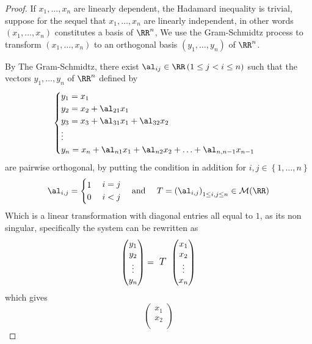 \begin{proof}
If $x_1, \hdots , x_n  $ are linearly dependent, the Hadamard
inequality is trivial, suppose for the sequel that
$x_1, \hdots , x_n  $ are linearly independent, 
in other words
$\left( x_1, \hdots , x_n  \right) $ constitutes a basis 
of $\RR ^n  $, We use the Gram-Schmidtz process to transform
$\left( x_1, \hdots , x_n  \right) $ to an orthogonal basis
$\left( y_1, \hdots , y_n  \right) $ of $\RR ^n  $.

By The Gram-Schmidtz, there exist $\al_{ij}\in  \RR  
\left( 1 \leq j <  i \leq n \right)$ 
such that the vectors $y_1, \hdots , y_n  $ of $\RR ^n  $ defined by
\[
\begin{cases}
y_1 = x_1 \\
y_2 = x_2 + \al_{21} x_1 \\
y_3 = x_3 + \al_{31} x_1 + \al_{32} x_2 \\
\vdots \\
y_n = x_n + \al_{n1}x_1 + \al_{n2} x_2 + \hdots  + 
\al_{n, n-1} x_{n-1}
\end{cases}
\]
are pairwise orthogonal, by putting the condition 
in addition for $i,j \in \left\{ 1, \hdots , n \right\} $  
\[
\al_{i,j} = 
\begin{cases}
1 \\
0
\end{cases}
\begin{gathered}  
 i = j\\ 
 i < j
\end{gathered}
\quad 
\text{ and } 
\quad 
T = \left( \al_{i,j} \right)_{1 \leq i,j \leq n}
\in  \mathcal{M} (\RR ) 
\]
Which is a linear transformation with diagonal entries all equal to
$1$, as its non singular, 
specifically the system can be rewritten as 
\[
	\begin{pmatrix}
		y_1 \\
		y_2 \\
		\vdots \\
		y_n \\
	\end{pmatrix} = 
	\text{ \large $T $ \normalfont} 
	\begin{pmatrix}
		x_1 \\
		x_2 \\
		\vdots  \\
		x_n  \\
	\end{pmatrix}
\]
which gives 
\[
\begin{pmatrix}
	x_1 \\
	x_2 \\

\end{pmatrix}\]
\end{proof}
